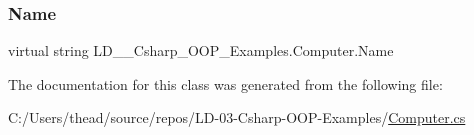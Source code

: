 \subsubsection{\texorpdfstring{Name}{Name}}
{\footnotesize\ttfamily virtual string L\+D\+\_\+\_\+\+Csharp\+\_\+\+O\+O\+P\+\_\+\+Examples.\+Computer.\+Name\hspace{0.3cm}{\ttfamily [get]}}



The documentation for this class was generated from the following file\+:\begin{DoxyCompactItemize}
\item 
C\+:/\+Users/thead/source/repos/\+L\+D-\/03-\/\+Csharp-\/\+O\+O\+P-\/\+Examples/\mbox{\hyperlink{_computer_8cs}{Computer.\+cs}}\end{DoxyCompactItemize}
